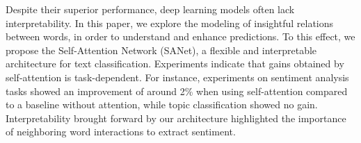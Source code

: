 Despite their superior performance, deep learning models often lack interpretability. In this paper, we explore the modeling of insightful relations between words, in order to understand and enhance predictions. To this effect, we propose the Self-Attention Network (SANet), a flexible and interpretable architecture for text classification. Experiments indicate that gains obtained by self-attention is task-dependent. For instance, experiments on sentiment analysis tasks showed an improvement of around 2\% when using self-attention compared to a baseline without attention, while topic classification showed no gain. Interpretability brought forward by our architecture  highlighted the importance of neighboring word interactions to extract sentiment.
